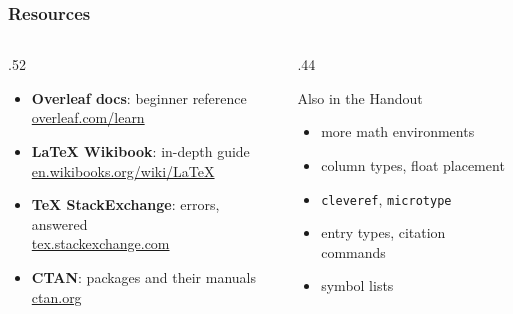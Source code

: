 
\begin{frame}
    \frametitle{Resources}
    \begin{columns}[T, onlytextwidth]
        \begin{column}{.52\textwidth}
            \begin{itemize}
                \item \textbf{Overleaf docs}: beginner reference\\
                    {\small\color{black!60}\href{https://www.overleaf.com/learn}{overleaf.com/learn}}
                \item \textbf{\LaTeX{} Wikibook}: in-depth guide\\
                    {\small\color{black!60}\href{https://en.wikibooks.org/wiki/LaTeX}{en.wikibooks.org/wiki/LaTeX}}
                \item \textbf{TeX StackExchange}: errors, answered\\
                    {\small\color{black!60}\href{https://tex.stackexchange.com}{tex.stackexchange.com}}
                \item \textbf{CTAN}: packages and their manuals\\
                    {\small\color{black!60}\href{https://ctan.org}{ctan.org}}
            \end{itemize}
        \end{column}
        \begin{column}{.44\textwidth}
            \begin{block}{Also in the Handout}
                \begin{itemize}
                    \item more math environments
                    \item column types, float placement
                    \item \texttt{cleveref}, \texttt{microtype}
                    \item entry types, citation commands
                    \item symbol lists
                \end{itemize}
            \end{block}
        \end{column}
    \end{columns}

\end{frame}
